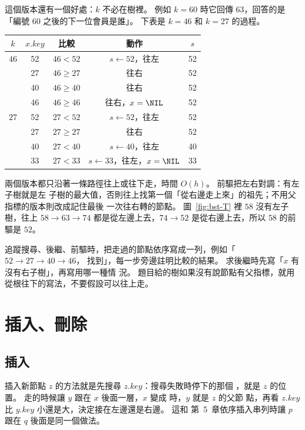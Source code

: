 這個版本還有一個好處：$k$ 不必在樹裡。 例如 $k = 60$ 時它回傳 $63$，回答的是「編號
$60$ 之後的下一位會員是誰」。 下表是 $k = 46$ 和 $k = 27$ 的過程。

\begin{center}
\begin{tabular}{ccccc}
\toprule
$k$ & $x.\mathit{key}$ & 比較 & 動作 & $s$ \\
\midrule
$46$ & 52 & $46 < 52$ & $s \gets 52$，往左 & 52 \\
     & 27 & $46 \ge 27$ & 往右 & 52 \\
     & 40 & $46 \ge 40$ & 往右 & 52 \\
     & 46 & $46 \ge 46$ & 往右，$x = \NIL$ & 52 \\
\midrule
$27$ & 52 & $27 < 52$ & $s \gets 52$，往左 & 52 \\
     & 27 & $27 \ge 27$ & 往右 & 52 \\
     & 40 & $27 < 40$ & $s \gets 40$，往左 & 40 \\
     & 33 & $27 < 33$ & $s \gets 33$，往左，$x = \NIL$ & 33 \\
\bottomrule
\end{tabular}
\end{center}

兩個版本都只沿著一條路徑往上或往下走，時間 $O(h)$。 前驅把左右對調：有左子樹就是左
子樹的最大值，否則往上找第一個「從右邊走上來」的祖先；不用父指標的版本則改成記住最後
一次往右轉的節點。 圖~\ref{fig:bst-T} 裡 $58$ 沒有左子樹，往上 $58 \to 63 \to 74$
都是從左邊上去，$74 \to 52$ 是從右邊上去，所以 $58$ 的前驅是 $52$。

\begin{examnote}
追蹤搜尋、後繼、前驅時，把走過的節點依序寫成一列，例如「$52 \to 27 \to 40 \to 46$，
找到」，每一步旁邊註明比較的結果。 求後繼時先寫「$x$ 有沒有右子樹」，再寫用哪一種情
況。 題目給的樹如果沒有說節點有父指標，就用從根往下的寫法，不要假設可以往上走。
\end{examnote}

\section{插入、刪除}
\label{sec:bst-modify}

\subsection{插入}

插入新節點 $z$ 的方法就是先搜尋 $z.\mathit{key}$：搜尋失敗時停下的那個 \NIL，就是
$z$ 的位置。 走的時候讓 $y$ 跟在 $x$ 後面一層，$x$ 變成 \NIL 時，$y$ 就是 $z$ 的父節
點，再看 $z.\mathit{key}$ 比 $y.\mathit{key}$ 小還是大，決定接在左邊還是右邊。 這和
第~5~章依序插入串列時讓 $p$ 跟在 $q$ 後面是同一個做法。

